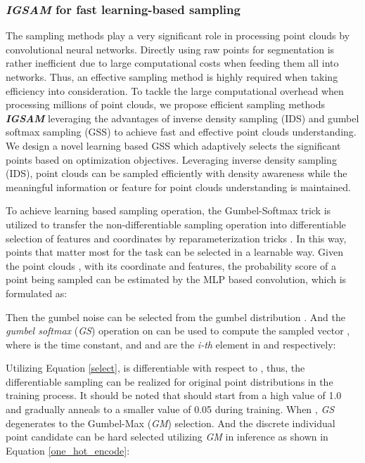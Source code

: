 \documentclass[journal]{IEEEtran}
\begin{document}
\subsubsection{\textit{\textbf{IGSAM}} for fast learning-based sampling}
The sampling methods play a very significant role in processing point clouds by convolutional neural networks.  Directly using raw points for segmentation is rather inefficient due to large computational costs when feeding them all into networks. Thus, an effective sampling method is highly required when taking efficiency into consideration. To tackle the large computational overhead when processing millions of point clouds, we propose efficient sampling methods \textit{\textbf{IGSAM}} leveraging the advantages of inverse density sampling (IDS) and gumbel softmax sampling (GSS) to achieve fast and effective point clouds understanding. We design a novel learning based GSS which adaptively selects the significant points based on optimization objectives. Leveraging inverse density sampling (IDS), point clouds can be sampled efficiently with density awareness while the meaningful information or feature for point clouds understanding is maintained.


















To achieve learning based sampling operation, the Gumbel-Softmax trick is utilized to transfer the non-differentiable sampling operation into differentiable selection of features and coordinates by reparameterization tricks \cite{maddison2016concrete}. In this way, points that matter most for the task can be selected in a learnable way. Given the point clouds , with its coordinate and features, the probability score  of a point being sampled can be estimated by the MLP based  convolution, which is formulated as:

 Then the gumbel noise \cite{maddison2016concrete}  can be selected from the gumbel distribution . And the \textit{gumbel softmax} (\textit{GS}) operation on  can be used to compute the sampled vector , where  is the time constant, and  and  are the \textit{i-th} element in  and  respectively:

Utilizing Equation \ref{select},  is differentiable with respect to , thus, the differentiable sampling can be realized for original point distributions in the training process. It should be noted that  should start from a high value of 1.0 and gradually anneals to a smaller value of 0.05 during training.
 When , \textit{GS} degenerates to the Gumbel-Max (\textit{GM}) selection. And the discrete individual point candidate can be hard selected utilizing \textit{GM} in inference as shown in Equation \ref{one_hot_encode}:
 
\end{document}
